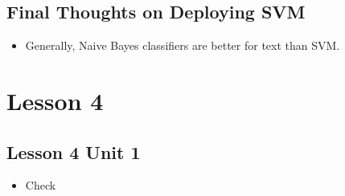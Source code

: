 \documentclass[12pt]{report}
\begin{document}
\subsection{Final Thoughts on Deploying SVM}

\begin{itemize}

\item Generally, Naive Bayes classifiers are better for text than SVM.

\end{itemize}

\section{Lesson 4}
\subsection{Lesson 4 Unit 1}

\begin{itemize}

\item Check

\end{itemize}
\end{document}
